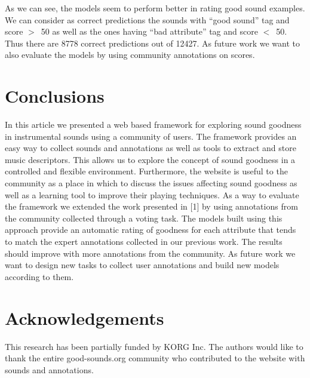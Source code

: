 \documentclass{article}
\begin{document}
As we can see, the models seem to perform better in rating good sound examples. We can consider as correct predictions the sounds with “good sound” tag and score $>$~50 as well as the ones having “bad attribute” tag and score $<$~50. Thus there are 8778 correct predictions out of 12427. 
As future work we want to also evaluate the models by using community annotations on scores.

\section{Conclusions}
In this article we presented a web based framework for exploring sound goodness in instrumental sounds using a community of users. The framework provides an easy way to collect sounds and annotations as well as tools to extract and store music descriptors. This allows us to explore the concept of sound goodness in a controlled and flexible environment. Furthermore, the website is useful to the community as a place in which to discuss the issues affecting sound goodness as well as a learning tool to improve their playing techniques. 
As a way to evaluate the framework we extended the work presented in [1] by using annotations from the community collected through a voting task. The models built using this approach provide an automatic rating of goodness for each attribute that tends to match the expert annotations collected in our previous work. The results should improve with more annotations from the community.
As future work we want to design new tasks to collect user annotations and build new models according to them. 

\section{Acknowledgements}
This research has been partially funded by KORG Inc. The authors would like to thank the entire good-sounds.org community who contributed to the website with sounds and annotations.

%
\end{document}
